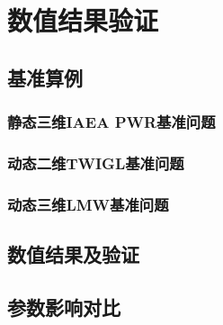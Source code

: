 

\chapter{数值结果验证}

\section{基准算例}
\subsection{静态三维IAEA PWR基准问题}
\label{sec:result.test.iaea}


\subsection{动态二维TWIGL基准问题}
\subsection{动态三维LMW基准问题}
\section{数值结果及验证}
\section{参数影响对比}
